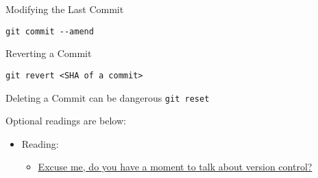 \documentclass[
]{book}
\providecommand{\tightlist}{%
  \setlength{\itemsep}{0pt}\setlength{\parskip}{0pt}}
\begin{document}
Modifying the Last Commit

\texttt{git\ commit\ -\/-amend}

Reverting a Commit

\texttt{git\ revert\ \textless{}SHA\ of\ a\ commit\textgreater{}}

Deleting a Commit
can be dangerous
\texttt{git\ reset}

Optional readings are below:

\begin{itemize}
\tightlist
\item
  Reading:

  \begin{itemize}
  \tightlist
  \item
    \href{https://peerj.com/preprints/3159/}{Excuse me, do you have a moment to talk about version control?}
  \end{itemize}
\end{itemize}

  
\end{document}

